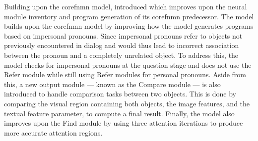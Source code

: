 Building upon the \gls{corefnmn} model, \citeauthor{cho_visual_2021} introduced \cite{cho_visual_2021} which improves upon the neural module inventory and program generation of its \gls{corefnmn} predecessor.
The model builds upon the \gls{corefnmn} model by improving how the model generates programs based on impersonal pronouns.
Since impersonal pronouns refer to objects not previously encountered in dialog and would thus lead to incorrect association between the pronoun and a completely unrelated object.
To address this, the model checks for impersonal pronouns at the question stage and does not use the Refer module while still using Refer modules for personal pronouns.
Aside from this, a new output module --- known as the Compare module --- is also introduced to handle comparison tasks between two objects.
This is done by comparing the visual region containing both objects, the image features, and the textual feature parameter, to compute a final result.
Finally, the model also improves upon the Find module by using three attention iterations to produce more accurate attention regions.
